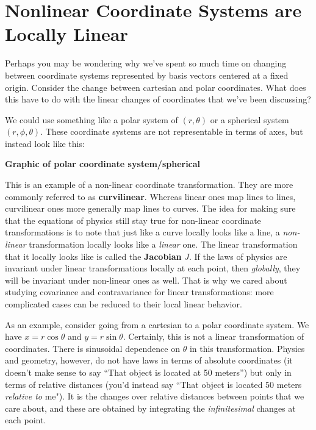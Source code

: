 
	\section[Nonlinear Coordinate Systems are Locally Linear]{Nonlinear Coordinate Systems are\\ Locally Linear}%
	\label{sec:nonlinear_coordinate_systems_are_locally_linear}
	
	Perhaps you may be wondering why we've spent so much time on changing between coordinate systems represented by basis vectors centered at a fixed origin. Consider the change between cartesian and polar coordinates. What does this have to do with the linear changes of coordinates that we've been discussing?
	
	We could use something like a polar system of $(r,\theta)$ or a spherical system $(r, \phi, \theta)$. These coordinate systems are not representable in terms of axes, but instead look like this:
	
	\textbf{Graphic of polar coordinate system/spherical} 
	
	This is an example of a non-linear coordinate transformation. They are more commonly referred to as \textbf{curvilinear}. Whereas linear ones map lines to lines, curvilinear ones more generally map lines to curves. The idea for making sure that the equations of physics still stay true for non-linear coordinate transformations is to note that just like a curve locally looks like a line, a \emph{non-linear} transformation locally looks like a \emph{linear} one. The linear transformation that it locally looks like is called the \textbf{Jacobian}  $J$. If the laws of physics are invariant under linear transformations locally at each point, then \emph{globally}, they will be invariant under non-linear ones as well. That is why we cared about studying covariance and contravariance for linear transformations: more complicated cases can be reduced to their local linear behavior.
	
	As an example, consider going from a cartesian to a polar coordinate system. We have $x = r \cos \theta$ and $y = r \sin \theta$. Certainly, this is not a linear transformation of coordinates. There is sinusoidal dependence on $\theta$ in this transformation. Physics and geometry, however, do not have laws in terms of absolute coordinates (it doesn't make sense to say ``That object is located at 50 meters'') but only in terms of relative distances (you'd instead say ``That object is located 50 meters \emph{relative to} me"). It is the changes over relative distances between points that we care about, and these are obtained by integrating the \emph{infinitesimal} changes at each point. 
	
